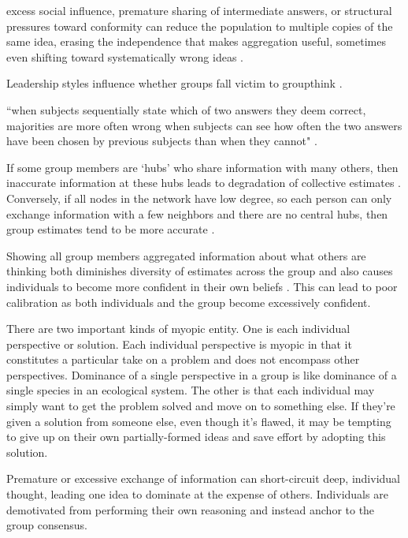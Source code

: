 excess social influence, premature sharing of intermediate answers, or structural pressures toward conformity can reduce the population to multiple copies of the same idea, erasing the independence that makes aggregation useful, sometimes even shifting toward systematically wrong ideas \citep{asch1951effects, bikhchandani1992theory}.

Leadership styles influence whether groups fall victim to groupthink \citep{flowers1977laboratory, leana1985partial}.

``when subjects sequentially state which of two answers they deem correct, majorities are more often wrong when subjects can see how often the two answers have been chosen by previous subjects than when they cannot" \citep{frey2021social}.

If some group members are `hubs' who share information with many others, then inaccurate information at these hubs leads to degradation of collective estimates \citep{becker2017network}.
Conversely, if all nodes in the network have low degree, so each person can only exchange information with a few neighbors and there are no central hubs, then group estimates tend to be more accurate \citep{becker2017network}. 

Showing all group members aggregated information about what others are thinking both diminishes diversity of estimates across the group and also causes individuals to become more confident in their own beliefs \citep{lorenz2011social}. This can lead to poor calibration as both individuals and the group become excessively confident.


There are two important kinds of myopic entity. One is each individual perspective or solution. Each individual perspective is myopic in that it constitutes a particular take on a problem and does not encompass other perspectives. Dominance of a single perspective in a group is like dominance of a single species in an ecological system. The other is that each individual may simply want to get the problem solved and move on to something else. If they're given a solution from someone else, even though it's flawed, it may be tempting to give up on their own partially-formed ideas and save effort by adopting this solution.

Premature or excessive exchange of information can short-circuit deep, individual thought, leading one idea to dominate at the expense of others. Individuals are demotivated from performing their own reasoning and instead anchor to the group consensus.

